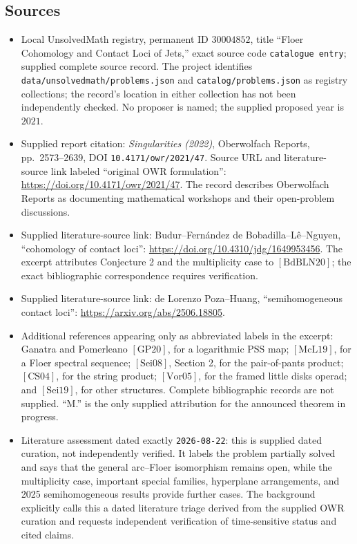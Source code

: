\documentclass[11pt]{article}
\begin{document}
\subsection{Sources}
\begin{itemize}
\item Local UnsolvedMath registry, permanent ID \(30004852\), title ``Floer Cohomology and Contact Loci of Jets,'' exact source code \texttt{catalogue entry}; supplied complete source record. The project identifies \texttt{data/unsolvedmath/problems.json} and \texttt{catalog/problems.json} as registry collections; the record's location in either collection has not been independently checked. No proposer is named; the supplied proposed year is \(2021\).
\item Supplied report citation: \emph{Singularities (2022)}, Oberwolfach Reports, pp.\ 2573--2639, DOI \texttt{10.4171/owr/2021/47}. Source URL and literature-source link labeled ``original OWR formulation'': \url{https://doi.org/10.4171/owr/2021/47}. The record describes Oberwolfach Reports as documenting mathematical workshops and their open-problem discussions.
\item Supplied literature-source link: Budur--Fern\'andez de Bobadilla--L\^e--Nguyen, ``cohomology of contact loci'': \url{https://doi.org/10.4310/jdg/1649953456}. The excerpt attributes Conjecture 2 and the multiplicity case to \([\mathrm{BdBLN20}]\); the exact bibliographic correspondence requires verification.
\item Supplied literature-source link: de Lorenzo Poza--Huang, ``semihomogeneous contact loci'': \url{https://arxiv.org/abs/2506.18805}.
\item Additional references appearing only as abbreviated labels in the excerpt: Ganatra and Pomerleano \([\mathrm{GP20}]\), for a logarithmic PSS map; \([\mathrm{McL19}]\), for a Floer spectral sequence; \([\mathrm{Sei08}]\), Section 2, for the pair-of-pants product; \([\mathrm{CS04}]\), for the string product; \([\mathrm{Vor05}]\), for the framed little disks operad; and \([\mathrm{Sei19}]\), for other structures. Complete bibliographic records are not supplied. ``M.'' is the only supplied attribution for the announced theorem in progress.
\item Literature assessment dated exactly \texttt{2026-08-22}: this is supplied dated curation, not independently verified. It labels the problem partially solved and says that the general arc--Floer isomorphism remains open, while the multiplicity case, important special families, hyperplane arrangements, and 2025 semihomogeneous results provide further cases. The background explicitly calls this a dated literature triage derived from the supplied OWR curation and requests independent verification of time-sensitive status and cited claims.

\end{itemize}
\end{document}

